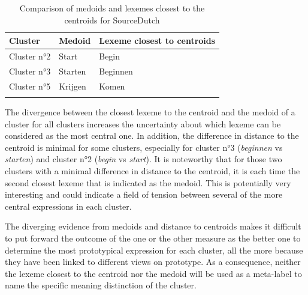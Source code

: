 \begin{table}
\caption{\label{tab:4:14}  Comparison of medoids and lexemes closest to the centroids for SourceDutch}
\begin{tabularx}{\textwidth}{XXl} 
\lsptoprule
Cluster & Medoid & Lexeme closest to centroids\\
\midrule
Cluster n°2 & Start & Begin\\
Cluster n°3 & Starten & Beginnen\\
Cluster n°5 & Krijgen & Komen\\
\lspbottomrule
\end{tabularx}
\end{table}

The divergence between the closest lexeme to the centroid and the medoid of a cluster for all clusters increases the uncertainty about which lexeme can be considered as the most central one. In addition, the difference in distance to the centroid is minimal for some clusters, especially for cluster n°3 (\textit{beginnen} vs \textit{starten}) and cluster n°2 (\textit{begin} vs \textit{start}). It is noteworthy that for those two clusters with a minimal difference in distance to the centroid, it is each time the second closest lexeme that is indicated as the medoid. This is potentially very interesting and could indicate a field of tension between several of the more central expressions in each cluster.

The diverging evidence from medoids and distance to centroids makes it difficult to put forward the outcome of the one or the other measure as the better one to determine the most prototypical expression for each cluster, all the more because they have been linked to different views on prototype. As a consequence, neither the lexeme closest to the centroid nor the medoid will be used as a meta-label to name the specific meaning distinction of the cluster.

